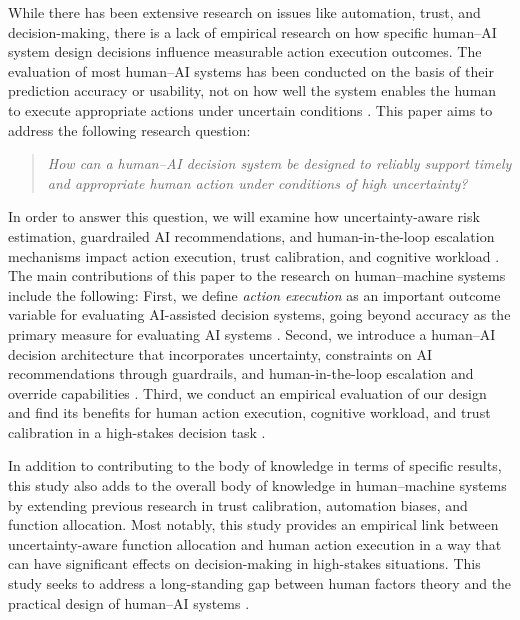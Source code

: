 \documentclass[journal]{IEEEtran}
\theoremstyle{plain}
\theoremstyle{definition}
\begin{document}
While there has been extensive research on issues like automation, trust, and decision-making, there is a lack of empirical research on how specific human--AI system design decisions influence measurable action execution outcomes. The evaluation of most human--AI systems has been conducted on the basis of their prediction accuracy or usability, not on how well the system enables the human to execute appropriate actions under uncertain conditions \cite{Lai2023FAccT,Muller2022CHIWORK,Yang2022THMSReview,lim2026generativeaidrivenreliabilitylayer}.
This paper aims to address the following research question:
\begin{quote}
    \emph{How can a human--AI decision system be designed to reliably support timely and appropriate human action under conditions of high uncertainty?}
\end{quote}
In order to answer this question, we will examine how uncertainty-aware risk estimation, guardrailed AI recommendations, and human-in-the-loop escalation mechanisms impact action execution, trust calibration, and cognitive workload \cite{McAllister2017IJCAI,Weidinger2022FAccT,Assaad2023TAS,Miller2019XRDS}.
The main contributions of this paper to the research on human--machine systems include the following: First, we define \emph{action execution} as an important outcome variable for evaluating AI-assisted decision systems, going beyond accuracy as the primary measure for evaluating AI systems \cite{Lai2023FAccT,Yang2022THMSReview}. Second, we introduce a human--AI decision architecture that incorporates uncertainty, constraints on AI recommendations through guardrails, and human-in-the-loop escalation and override capabilities \cite{Assaad2023TAS,Bach2024Access}. Third, we conduct an empirical evaluation of our design and find its benefits for human action execution, cognitive workload, and trust calibration in a high-stakes decision task \cite{Bach2024Access,PerezCerrolaza2024CSUR}.

In addition to contributing to the body of knowledge in terms of specific results, this study also adds to the overall body of knowledge in human--machine systems by extending previous research in trust calibration, automation biases, and function allocation. Most notably, this study provides an empirical link between uncertainty-aware function allocation and human action execution in a way that can have significant effects on decision-making in high-stakes situations. This study seeks to address a long-standing gap between human factors theory and the practical design of human--AI systems \cite{Yang2022THMSReview,Hodgson2013THMS,Lai2023FAccT}.
\end{document}
